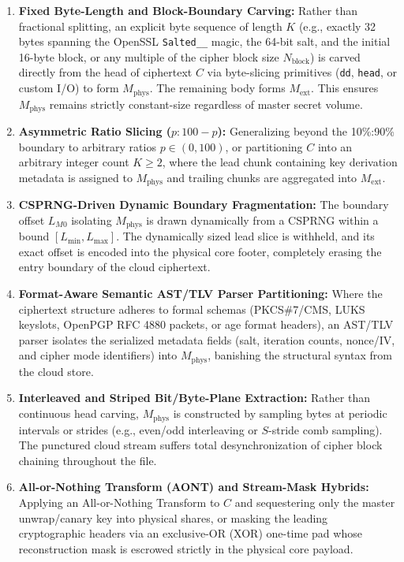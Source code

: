 \documentclass[11pt,a4paper,titlepage]{article}
\begin{document}
\begin{enumerate}
  \item \textbf{Fixed Byte-Length and Block-Boundary Carving:}
    Rather than fractional splitting, an explicit byte sequence of length $K$ (e.g., exactly 32 bytes spanning the OpenSSL \texttt{Salted\_\_} magic, the 64-bit salt, and the initial 16-byte block, or any multiple of the cipher block size $N_{\text{block}}$) is carved directly from the head of ciphertext $C$ via byte-slicing primitives (\texttt{dd}, \texttt{head}, or custom I/O) to form $M_{\text{phys}}$. The remaining body forms $M_{\text{ext}}$. This ensures $M_{\text{phys}}$ remains strictly constant-size regardless of master secret volume.
  \item \textbf{Asymmetric Ratio Slicing ($p : 100-p$):}
    Generalizing beyond the 10\%:90\% boundary to arbitrary ratios $p \in (0, 100)$, or partitioning $C$ into an arbitrary integer count $K \ge 2$, where the lead chunk containing key derivation metadata is assigned to $M_{\text{phys}}$ and trailing chunks are aggregated into $M_{\text{ext}}$.
  \item \textbf{CSPRNG-Driven Dynamic Boundary Fragmentation:}
    The boundary offset $L_{M0}$ isolating $M_{\text{phys}}$ is drawn dynamically from a CSPRNG within a bound $[L_{\min}, L_{\max}]$. The dynamically sized lead slice is withheld, and its exact offset is encoded into the physical core footer, completely erasing the entry boundary of the cloud ciphertext.
  \item \textbf{Format-Aware Semantic AST/TLV Parser Partitioning:}
    Where the ciphertext structure adheres to formal schemas (PKCS\#7/CMS, LUKS keyslots, OpenPGP RFC 4880 packets, or age format headers), an AST/TLV parser isolates the serialized metadata fields (salt, iteration counts, nonce/IV, and cipher mode identifiers) into $M_{\text{phys}}$, banishing the structural syntax from the cloud store.
  \item \textbf{Interleaved and Striped Bit/Byte-Plane Extraction:}
    Rather than continuous head carving, $M_{\text{phys}}$ is constructed by sampling bytes at periodic intervals or strides (e.g., even/odd interleaving or $S$-stride comb sampling). The punctured cloud stream suffers total desynchronization of cipher block chaining throughout the file.
  \item \textbf{All-or-Nothing Transform (AONT) and Stream-Mask Hybrids:}
    Applying an All-or-Nothing Transform to $C$ and sequestering only the master unwrap/canary key into physical shares, or masking the leading cryptographic headers via an exclusive-OR (XOR) one-time pad whose reconstruction mask is escrowed strictly in the physical core payload.
\end{enumerate}
\fi
\end{document}
